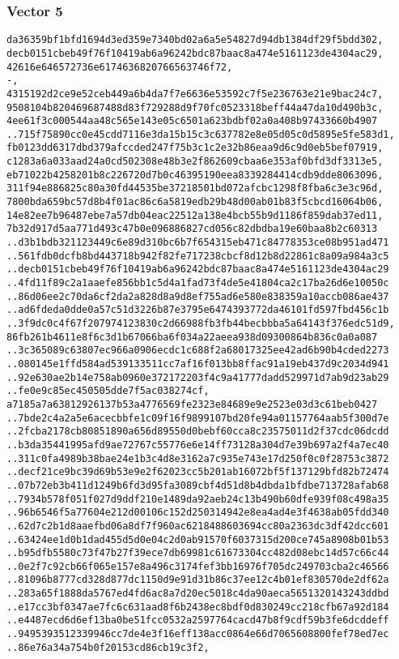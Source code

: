 \documentclass[
]{article}
\begin{document}
\hypertarget{vector-5-2}{%
\subsubsection{Vector 5}\label{vector-5-2}}

\begin{verbatim}
da36359bf1bfd1694d3ed359e7340bd02a6a5e54827d94db1384df29f5bdd302,
decb0151cbeb49f76f10419ab6a96242bdc87baac8a474e5161123de4304ac29,
42616e646572736e6174636820766563746f72,
-,
4315192d2ce9e52ceb449a6b4da7f7e6636e53592c7f5e236763e21e9bac24c7,
9508104b820469687488d83f729288d9f70fc0523318beff44a47da10d490b3c,
4ee61f3c000544aa48c565e143e05c6501a623bdbf02a0a408b97433660b4907
..715f75890cc0e45cdd7116e3da15b15c3c637782e8e05d05c0d5895e5fe583d1,
fb0123dd6317dbd379afccded247f75b3c1c2e32b86eaa9d6c9d0eb5bef07919,
c1283a6a033aad24a0cd502308e48b3e2f862609cbaa6e353af0bfd3df3313e5,
eb71022b4258201b8c226720d7b0c46395190eea8339284414cdb9dde8063096,
311f94e886825c80a30fd44535be37218501bd072afcbc1298f8fba6c3e3c96d,
7800bda659bc57d8b4f01ac86c6a5819edb29b48d00ab01b83f5cbcd16064b06,
14e82ee7b96487ebe7a57db04eac22512a138e4bcb55b9d1186f859dab37ed11,
7b32d917d5aa771d493c47b0e096886827cd056c82dbdba19e60baa8b2c60313
..d3b1bdb321123449c6e89d310bc6b7f654315eb471c84778353ce08b951ad471
..561fdb0dcfb8bd443718b942f82fe717238cbcf8d12b8d22861c8a09a984a3c5
..decb0151cbeb49f76f10419ab6a96242bdc87baac8a474e5161123de4304ac29
..4fd11f89c2a1aaefe856bb1c5d4a1fad73f4de5e41804ca2c17ba26d6e10050c
..86d06ee2c70da6cf2da2a828d8a9d8ef755ad6e580e838359a10accb086ae437
..ad6fdeda0dde0a57c51d3226b87e3795e6474393772da46101fd597fbd456c1b
..3f9dc0c4f67f207974123830c2d66988fb3fb44becbbba5a64143f376edc51d9,
86fb261b4611e8f6c3d1b67066ba6f034a22aeea938d09300864b836c0a0a087
..3c365089c63807ec966a0906ecdc1c688f2a68017325ee42ad6b90b4cded2273
..080145e1ffd584ad539133511cc7af16f013bb8ffac91a19eb437d9c2034d941
..92e630ae2b14e758ab0960e372172203f4c9a41777dadd529971d7ab9d23ab29
..fe0e9c85ec450505dde7f5ac038274cf,
a7185a7a63812926137b53a4776569fe2323e84689e9e2523e03d3c61beb0427
..7bde2c4a2a5e6acecbbfe1c09f16f9899107bd20fe94a01157764aab5f300d7e
..2fcba2178cb80851890a656d89550d0bebf60cca8c23575011d2f37cdc06dcdd
..b3da35441995afd9ae72767c55776e6e14ff73128a304d7e39b697a2f4a7ec40
..311c0fa4989b38bae24e1b3c4d8e3162a7c935e743e17d250f0c0f28753c3872
..decf21ce9bc39d69b53e9e2f62023cc5b201ab16072bf5f137129bfd82b72474
..07b72eb3b411d1249b6fd3d95fa3089cbf4d51d8b4dbda1bfdbe713728afab68
..7934b578f051f027d9ddf210e1489da92aeb24c13b490b60dfe939f08c498a35
..96b6546f5a77604e212d00106c152d250314942e8ea4ad4e3f4638ab05fdd340
..62d7c2b1d8aaefbd06a8df7f960ac6218488603694cc80a2363dc3df42dcc601
..63424ee1d0b1dad455d5d0e04c2d0ab91570f6037315d200ce745a8908b01b53
..b95dfb5580c73f47b27f39ece7db69981c61673304cc482d08ebc14d57c66c44
..0e2f7c92cb66f065e157e8a496c3174fef3bb16976f705dc249703cba2c46566
..81096b8777cd328d877dc1150d9e91d31b86c37ee12c4b01ef830570de2df62a
..283a65f1888da5767ed4fd6ac8a7d20ec5018c4da90aeca5651320143243ddbd
..e17cc3bf0347ae7fc6c631aad8f6b2438ec8bdf0d830249cc218cfb67a92d184
..e4487ecd6d6ef13ba0be51fcc0532a2597764cacd47b8f9cdf59b3fe6dcddeff
..9495393512339946cc7de4e3f16eff138acc0864e66d7065608800fef78ed7ec
..86e76a34a754b0f20153cd86cb19c3f2,
\end{verbatim}
\end{document}
